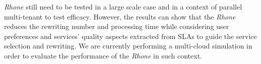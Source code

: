 \textit{Rhone} still need to be tested in a large scale case and in a context of
parallel multi-tenant to test efficacy. 
However, the results can show that the \textit{Rhone} reduces the rewriting
number and processing time while considering user preferences and services'
quality aspects extracted from SLAs to guide the service selection and rewriting.
We are currently performing a multi-cloud simulation in order to evaluate the
performance of the \textit{Rhone} in such context.  



